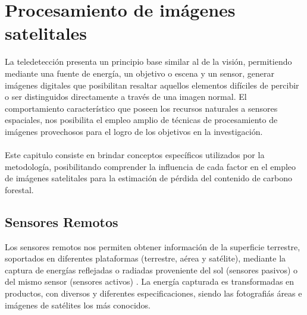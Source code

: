 
\newpage{\ } 
\thispagestyle{empty} 

\chapter{Procesamiento de im\'agenes satelitales}
La teledetecci\'on presenta un principio base similar al de la visi\'on, permitiendo mediante una fuente de energ\'ia, un objetivo o escena y un sensor, generar im\'agenes digitales que posibilitan resaltar aquellos elementos dif\'iciles de percibir o ser distinguidos directamente a trav\'es de una imagen normal. El comportamiento caracter\'istico que poseen los recursos naturales a sensores espaciales, nos posibilita el empleo amplio de t\'ecnicas de procesamiento de im\'agenes provechosos para el logro de los objetivos en la investigaci\'on. \\~\\
Este capitulo consiste en brindar conceptos espec\'ificos utilizados por la metodolog\'ia, posibilitando comprender la influencia de cada factor en el empleo de im\'agenes satelitales para la estimaci\'on de p\'erdida del contenido de carbono forestal.

\section{Sensores Remotos}
Los sensores remotos nos permiten obtener informaci\'on de la superficie terrestre, soportados en diferentes plataformas (terrestre, a\'erea y sat\'elite), mediante la captura de energ\'ias reflejadas o radiadas proveniente del sol (sensores pasivos) o del mismo sensor (sensores activos) \cite{gustavo2012deteccion}. La energ\'ia capturada es transformadas en productos, con diversos y diferentes especificaciones, siendo las fotografi\'as \'areas e im\'agenes de sat\'elites los m\'as conocidos.
